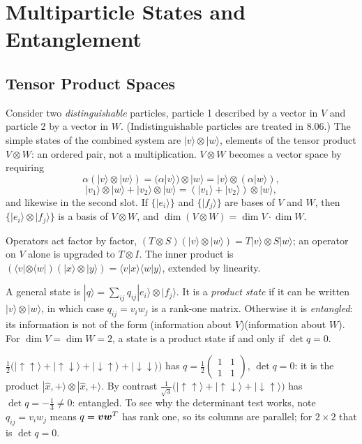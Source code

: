 \chapter{Multiparticle States and Entanglement}
\label{ch:entanglement}

\section{Tensor Product Spaces}

Consider two \emph{distinguishable} particles, particle 1 described by a vector in $V$ and particle 2 by a vector in $W$. (Indistinguishable particles are treated in 8.06.) The simple states of the combined system are $|v\rangle\otimes|w\rangle$, elements of the tensor product $V\otimes W$: an ordered pair, not a multiplication. $V\otimes W$ becomes a vector space by requiring
\[
    \alpha(|v\rangle\otimes|w\rangle) = (\alpha|v\rangle)\otimes|w\rangle = |v\rangle\otimes(\alpha|w\rangle),
\]
\[
    |v_1\rangle\otimes|w\rangle + |v_2\rangle\otimes|w\rangle = (|v_1\rangle+|v_2\rangle)\otimes|w\rangle,
\]
and likewise in the second slot. If $\{|e_i\rangle\}$ and $\{|f_j\rangle\}$ are bases of $V$ and $W$, then $\{|e_i\rangle\otimes|f_j\rangle\}$ is a basis of $V\otimes W$, and $\dim(V\otimes W) = \dim V\cdot\dim W$.

Operators act factor by factor, $(T\otimes S)(|v\rangle\otimes|w\rangle) = T|v\rangle\otimes S|w\rangle$; an operator on $V$ alone is upgraded to $T\otimes I$. The inner product is $(\langle v|\otimes\langle w|)(|x\rangle\otimes|y\rangle) = \langle v|x\rangle\langle w|y\rangle$, extended by linearity.

\begin{definition}
A general state is $|q\rangle = \sum_{ij}q_{ij}|e_i\rangle\otimes|f_j\rangle$. It is a \emph{product state} if it can be written $|v\rangle\otimes|w\rangle$, in which case $q_{ij} = v_iw_j$ is a rank-one matrix. Otherwise it is \emph{entangled}: its information is not of the form (information about $V$)(information about $W$). For $\dim V = \dim W = 2$, a state is a product state if and only if $\det q = 0$.
\end{definition}

\begin{example}
$\frac12\bigl(|{\uparrow\uparrow}\rangle + |{\uparrow\downarrow}\rangle + |{\downarrow\uparrow}\rangle + |{\downarrow\downarrow}\rangle\bigr)$ has $q = \frac12\begin{pmatrix}1&1\\1&1\end{pmatrix}$, $\det q = 0$: it is the product $|\hat{x},+\rangle\otimes|\hat{x},+\rangle$. By contrast $\frac{1}{\sqrt3}\bigl(|{\uparrow\uparrow}\rangle + |{\uparrow\downarrow}\rangle + |{\downarrow\uparrow}\rangle\bigr)$ has $\det q = -\frac13\neq0$: entangled. To see why the determinant test works, note $q_{ij} = v_iw_j$ means $q = \bm{v}\bm{w}^T$ has rank one, so its columns are parallel; for $2\times2$ that is $\det q = 0$.
\end{example}

